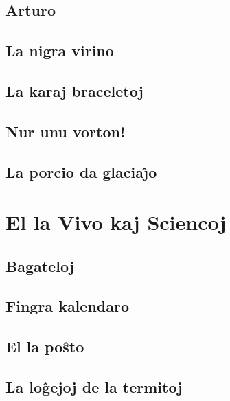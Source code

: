 \documentclass[a5paper,11pt,openany,twoside,leqno]{book}
\begin{document}
\section{Arturo}
\label{arturo}


\newpage %

\section{La nigra virino}
\label{nigra}


\section{La karaj braceletoj}
\label{braceletoj}


\section{Nur unu vorton!}
\label{unuvorton}


\section{La porcio da glacia\^{\j}o}
\label{porcio}


%
%
\chapter{El la Vivo kaj Sciencoj}
\section{Bagateloj}
\label{bagateloj}


\section{Fingra kalendaro}
\label{fingra}


\section{El la po\^sto}
\label{posxto}


\section{La lo\^gejoj de la termitoj}
\label{termitoj}

\end{document}

